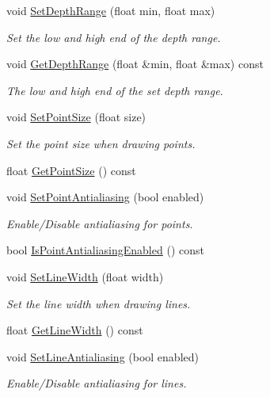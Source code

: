 \begin{DoxyCompactItemize}
\item 
void \hyperlink{class_g_f_w_1_1_context_state_af2ead11abc05ce454e09d4357f70015d}{Set\+Depth\+Range} (float min, float max)
\begin{DoxyCompactList}\small\item\em Set the low and high end of the depth range. \end{DoxyCompactList}\item 
void \hyperlink{class_g_f_w_1_1_context_state_a07c2828b667abf5cb3539b89ba8328ff}{Get\+Depth\+Range} (float \&min, float \&max) const
\begin{DoxyCompactList}\small\item\em The low and high end of the set depth range. \end{DoxyCompactList}\item 
void \hyperlink{class_g_f_w_1_1_context_state_a916f5ca06b29cb5a506759748cb9bb75}{Set\+Point\+Size} (float size)
\begin{DoxyCompactList}\small\item\em Set the point size when drawing points. \end{DoxyCompactList}\item 
float \hyperlink{class_g_f_w_1_1_context_state_a93b78ad64f73d1301592bd06a88ef4d0}{Get\+Point\+Size} () const
\item 
void \hyperlink{class_g_f_w_1_1_context_state_a0efa713914d80597e2f5b6e225190818}{Set\+Point\+Antialiasing} (bool enabled)
\begin{DoxyCompactList}\small\item\em Enable/\+Disable antialiasing for points. \end{DoxyCompactList}\item 
bool \hyperlink{class_g_f_w_1_1_context_state_a9c1b9ff0dc7ec95bc15243ec61c9f1b5}{Is\+Point\+Antialiasing\+Enabled} () const
\item 
void \hyperlink{class_g_f_w_1_1_context_state_a0cbbcf527df67fec78f9e9e834b7f562}{Set\+Line\+Width} (float width)
\begin{DoxyCompactList}\small\item\em Set the line width when drawing lines. \end{DoxyCompactList}\item 
float \hyperlink{class_g_f_w_1_1_context_state_a6c1756ec8ba275b93d6356f0eb88f45b}{Get\+Line\+Width} () const
\item 
void \hyperlink{class_g_f_w_1_1_context_state_adacd3a218340e71e104b8a40cf3b8919}{Set\+Line\+Antialiasing} (bool enabled)
\begin{DoxyCompactList}\small\item\em Enable/\+Disable antialiasing for lines. \end{DoxyCompactList}\item 

\end{DoxyCompactItemize}
